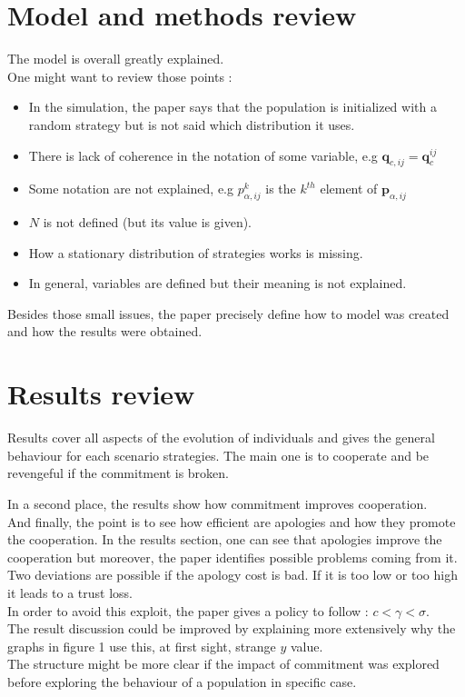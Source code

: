 \documentclass{article}
\begin{document}
\section{Model and methods review}
The model is overall greatly explained.\\
One might want to review those points :
\begin{itemize}
\item In the simulation, the paper says that the population is initialized with a random strategy but is not said which distribution it uses.
\item There is lack of coherence in the notation of some variable, e.g $\mathbf{q}_{c, ij} = \mathbf{q}_{c}^{ij}$
\item Some notation are not explained, e.g $p^{k}_{\alpha, ij}$ is the $k^{th}$ element of $\mathbf{p}_{\alpha,ij}$
\item $N$ is not defined (but its value is given).
\item How a stationary distribution of strategies works is missing.
\item In general, variables are defined but their meaning is not explained.
\end{itemize}
Besides those small issues, the paper precisely define how to model was created and how the results were obtained.


\section{Results review}
Results cover all aspects of the evolution of individuals and gives the general behaviour for each scenario strategies. The main one is to cooperate and be revengeful if the commitment is broken.

In a second place, the results show how commitment improves cooperation.\\

And finally, the point is to see how efficient are apologies and how they promote the cooperation. In the results section, one can see that apologies improve the cooperation but moreover, the paper identifies possible problems coming from it. \\
Two deviations are possible if the apology cost is bad. If it is too low or too high it leads to a trust loss.\\
In order to avoid this exploit, the paper gives a policy to follow : $c<\gamma<\sigma$.\\

The result discussion could be improved by explaining more extensively why the graphs in figure 1 use this, at first sight, strange $y$ value.\\
The structure might be more clear if the impact of commitment was explored before exploring the behaviour of a population in specific case.
\end{document}
